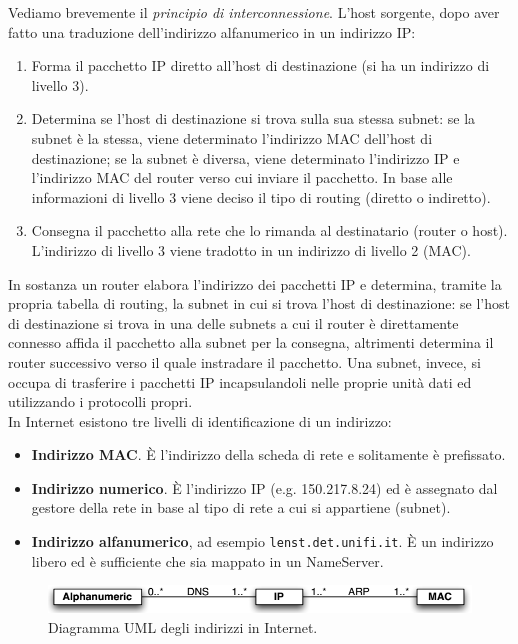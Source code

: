 Vediamo brevemente il \textit{principio di interconnessione}. L'host sorgente, dopo aver fatto una traduzione dell'indirizzo alfanumerico in un indirizzo IP:
\begin{enumerate}
	\item Forma il pacchetto IP diretto all'host di destinazione (si ha un indirizzo di livello 3).
	\item Determina se l'host di destinazione si trova sulla sua stessa subnet: se la subnet è la stessa, viene determinato l'indirizzo MAC dell'host di destinazione; se la subnet è diversa, viene determinato l'indirizzo IP e l'indirizzo MAC del router verso cui inviare il pacchetto. In base alle informazioni di livello 3 viene deciso il tipo di routing (diretto o indiretto).
	\item Consegna il pacchetto alla rete che lo rimanda al destinatario (router o host). L'indirizzo di livello 3 viene tradotto in un indirizzo di livello 2 (MAC).
\end{enumerate}
In sostanza un router elabora l'indirizzo dei pacchetti IP e determina, tramite la propria tabella di routing, la subnet in cui si trova l'host di destinazione: se l'host di destinazione si trova in una delle subnets a cui il router è direttamente connesso affida il pacchetto alla subnet per la consegna, altrimenti determina il router successivo verso il quale instradare il pacchetto. Una subnet, invece, si occupa di trasferire i pacchetti IP incapsulandoli nelle proprie unità dati ed utilizzando i protocolli propri.\\
In Internet esistono tre livelli di identificazione di un indirizzo:
\begin{itemize}
	\item \textbf{Indirizzo MAC}. È l'indirizzo della scheda di rete e solitamente è prefissato.
	\item \textbf{Indirizzo numerico}. È l'indirizzo IP (e.g. 150.217.8.24) ed è assegnato dal gestore della rete in base al tipo di rete a cui si appartiene (subnet).
	\item \textbf{Indirizzo alfanumerico}, ad esempio \texttt{lenst.det.unifi.it}. È un indirizzo libero ed è sufficiente che sia mappato in un NameServer.
\end{itemize}
\begin{figure}[htbp]
	\centering
	\includegraphics[scale = 0.5]{images/UML-address}
	\caption{Diagramma UML degli indirizzi in Internet.}
	\label{img:UML-address}
\end{figure}
